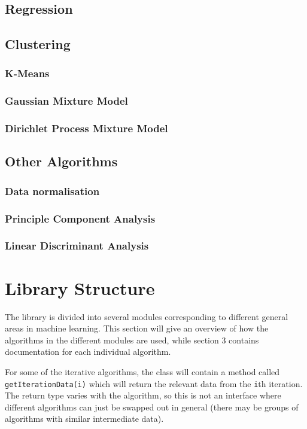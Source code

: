 \documentclass[a4paper]{article}
\begin{document}
\subsection{Regression}

\subsection{Clustering}
\subsubsection{K-Means}

\subsubsection{Gaussian Mixture Model}

\subsubsection{Dirichlet Process Mixture Model}


\subsection{Other Algorithms}
\subsubsection{Data normalisation}

\subsubsection{Principle Component Analysis}

\subsubsection{Linear Discriminant Analysis}


\section{Library Structure}
The library is divided into several modules corresponding to different general areas in machine learning. This section will give an overview of how the algorithms in the different modules are used, while section 3 contains documentation for each individual algorithm.

For some of the iterative algorithms, the class will contain a method called \texttt{getIterationData(i)} which will return the relevant data from the \texttt{i}th iteration. The return type varies with the algorithm, so this is not an interface where different algorithms can just be swapped out in general (there may be groups of algorithms with similar intermediate data).
\end{document}
